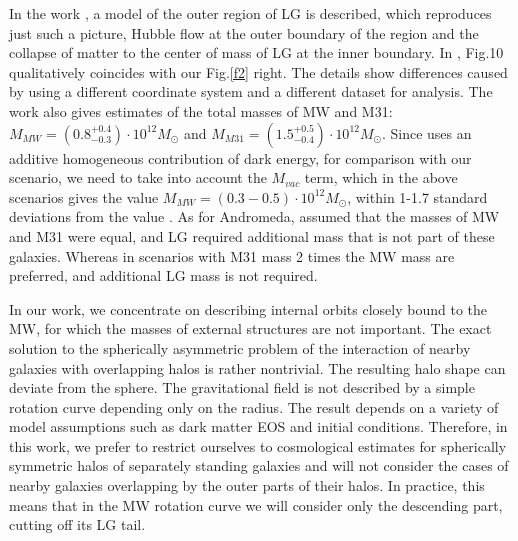 \documentclass{article}
\begin{document}
In the work \cite {1405.0306}, a model of the outer region of LG is described, which reproduces just such a picture, Hubble flow at the outer boundary of the region and the collapse of matter to the center of mass of LG at the inner boundary. In \cite {1405.0306}, Fig.10 qualitatively coincides with our Fig.\ref {f2} right. The details show differences caused by using a different coordinate system and a different dataset for analysis. The work \cite {1405.0306} also gives estimates of the total masses of MW and M31: $ M_ {MW} = (0.8 ^ {+ 0.4} _ {- 0.3}) \cdot10 ^ {12} M_ \odot $ and $ M_ {M31} = (1.5 ^ {+ 0.5} _ {- 0.4}) \cdot10 ^ {12} M_ \odot $. Since \cite {1405.0306} uses an additive homogeneous contribution of dark energy, for comparison with our scenario, we need to take into account the $ M_ {vac} $ term, which in the above scenarios gives the value $ M_ {MW} = (0.3-0.5) \cdot10 ^ {12} M_ \odot $, within 1-1.7 standard deviations from the value \cite {1405.0306}. As for Andromeda, \cite {0811.0860} assumed that the masses of MW and M31 were equal, and LG required additional mass that is not part of these galaxies. Whereas in \cite {1405.0306} scenarios with M31 mass 2 times the MW mass are preferred, and additional LG mass is not required.

In our work, we concentrate on describing internal orbits closely bound to the MW, for which the masses of external structures are not important. The exact solution to the spherically asymmetric problem of the interaction of nearby galaxies with overlapping halos is rather nontrivial. The resulting halo shape can deviate from the sphere. The gravitational field is not described by a simple rotation curve depending only on the radius. The result depends on a variety of model assumptions such as dark matter EOS and initial conditions. Therefore, in this work, we prefer to restrict ourselves to cosmological estimates for spherically symmetric halos of separately standing galaxies and will not consider the cases of nearby galaxies overlapping by the outer parts of their halos. In practice, this means that in the MW rotation curve we will consider only the descending part, cutting off its LG tail. 
\end{document}
